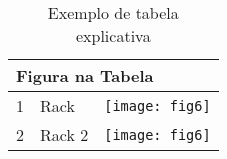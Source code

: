 \begin{table}[h!]
\centering
\caption{Exemplo de tabela explicativa}
\label{tab4}
\begin{tabular}{|l|l|l|}
\hline
\multicolumn{3}{|l|}{Figura na Tabela} \\ \hline
1        & Rack          & \texttt{[image: fig6]}        \\ \hline
2        & Rack 2        & \texttt{[image: fig6]}        \\ \hline
\end{tabular}
\end{table}